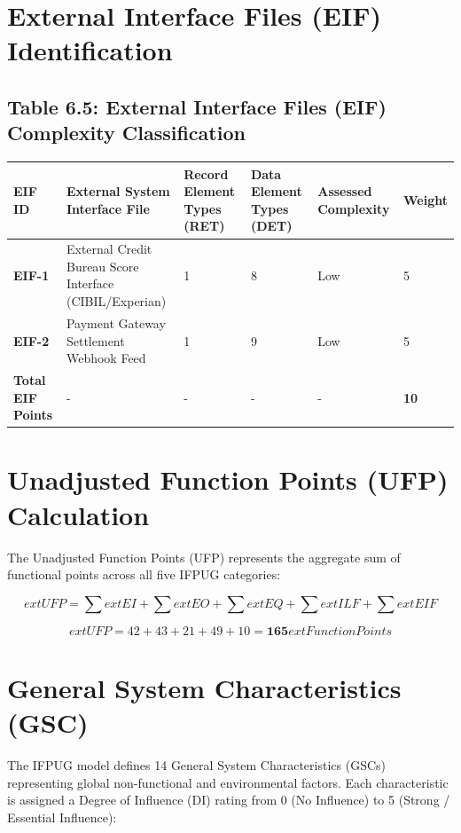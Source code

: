 \documentclass[12pt,a4paper,oneside]{report}
\begin{document}
\section{External Interface Files (EIF) Identification}

\subsection{Table 6.5: External Interface Files (EIF) Complexity Classification}

\begin{table}[htbp]
\centering
\small
\begin{tabularx}{\textwidth}{p{2.5cm} X X X X X}
\toprule
\textbf{EIF ID} & \textbf{External System Interface File} & \textbf{Record Element Types (RET)} & \textbf{Data Element Types (DET)} & \textbf{Assessed Complexity} & \textbf{Weight} \\
\midrule
\textbf{EIF-1} & External Credit Bureau Score Interface (CIBIL/Experian) & 1 & 8 & Low & 5 \\
\textbf{EIF-2} & Payment Gateway Settlement Webhook Feed & 1 & 9 & Low & 5 \\
\textbf{Total EIF Points} & - & - & - & - & \textbf{10} \\
\bottomrule
\end{tabularx}
\end{table}

\section{Unadjusted Function Points (UFP) Calculation}

The Unadjusted Function Points (UFP) represents the aggregate sum of functional points across all five IFPUG categories:

$$	ext{UFP} = \sum 	ext{EI} + \sum 	ext{EO} + \sum 	ext{EQ} + \sum 	ext{ILF} + \sum 	ext{EIF}$$

$$	ext{UFP} = 42 + 43 + 21 + 49 + 10 = \mathbf{165} 	ext{ Function Points}$$

\section{General System Characteristics (GSC)}

The IFPUG model defines 14 General System Characteristics (GSCs) representing global non-functional and environmental factors. Each characteristic is assigned a Degree of Influence (DI) rating from 0 (No Influence) to 5 (Strong / Essential Influence):
\end{document}
